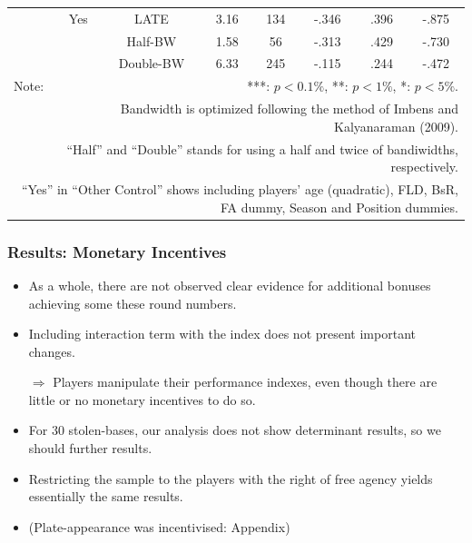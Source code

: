 \documentclass[dvipdfmx,12pt]{beamer}
\begin{document}
\begin{frame}
\begin{table}[!]
\begin{tabular}{lccccccc}
      & Yes & LATE & 3.16 & 134 & -.346 & .396 & -.875 \\
      & & Half-BW & 1.58 & 56 & -.313 & .429 & -.730 \\
      & & Double-BW & 6.33 & 245 & -.115 & .244 & -.472 \\ \hline

      Note: & \multicolumn{7}{r}{***: $p<0.1\%$, **: $p<1\%$, *: $p<5\%$.} \\
      & \multicolumn{7}{r}{Bandwidth is optimized following the method of Imbens and Kalyanaraman (2009).} \\
      & \multicolumn{7}{r}{``Half'' and ``Double'' stands for using a half and twice of bandiwidths, respectively.} \\
      \multicolumn{8}{r}{
      ``Yes'' in ``Other Control'' shows including players' age (quadratic), FLD, BsR, FA dummy, Season and Position dummies.
      }
    \end{tabular}
  \end{table}
\end{frame}


\begin{frame}\frametitle{Results: Monetary Incentives}
  \begin{itemize}
    \item As a whole, there are not observed clear evidence for additional bonuses achieving some these round numbers.

    \item Including interaction term with the index does not present important changes.

    $\Rightarrow$ Players manipulate their performance indexes, even though there are little or no monetary incentives to do so.

    \item For 30 stolen-bases, our analysis does not show determinant results, so we should further results.

    \item Restricting the sample to the players with the right of free agency yields essentially the same results.

    \item (Plate-appearance was incentivised: Appendix)

  \end{itemize}
\end{frame}
\end{document}
